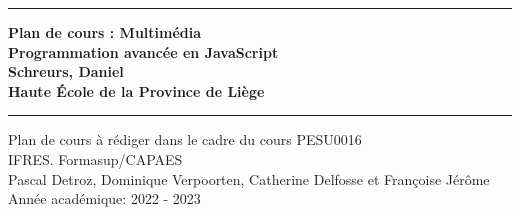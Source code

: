 \newcommand{\JMUTitle}[9]{
    \thispagestyle{empty}
    \vspace*{\stretch{1}}
    {\parindent0cm
        \rule{\linewidth}{.7ex}}
    \begin{flushright}
        \vspace*{\stretch{1}}
        \bfseries\Huge
        #1\\
        \vspace*{\stretch{0.2}}
        \bfseries\Large
        #2\\
        \vspace*{\stretch{1}}
        \bfseries\large
        #4\\
        \vspace*{\stretch{0.2}}
        \bfseries\large
        #9
    \end{flushright}
    \rule{\linewidth}{.7ex}

    \vspace*{\stretch{1}}
    \begin{center}
        \vspace*{\stretch{1}}
        \Large #3 \\

        \vspace*{\stretch{2}}
        \large IFRES. Formasup/CAPAES\\
        \vspace*{\stretch{1}}
        \large   #8 \\[1mm]
        \large Année académique: #5 - #6
    \end{center}
}
\JMUTitle
{Plan de cours : Multimédia}                                %
{Programmation avancée en JavaScript}                            %
{Plan de cours à rédiger dans le cadre du cours PESU0016}       %
{Schreurs, Daniel }                              %
{2022}                                      %
{2023}                                      %
{Bachelor/Master Wirtschaftsinformatik}           %
{Pascal Detroz, Dominique Verpoorten, Catherine Delfosse et Françoise Jérôme}                       %
{Haute École de la Province de Liège}                                        %
\clearpage